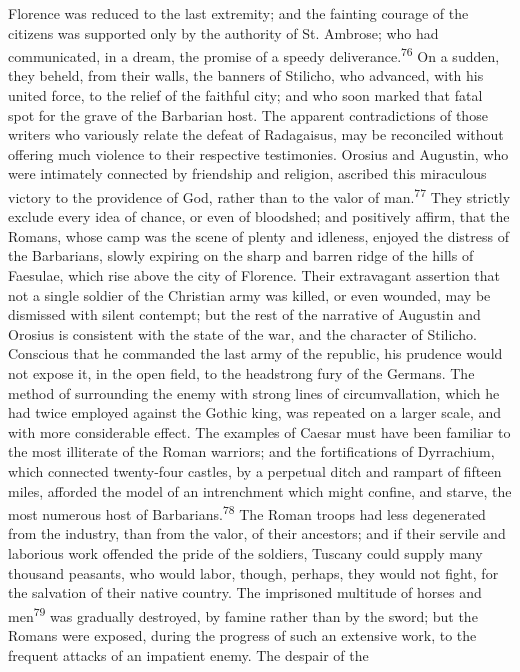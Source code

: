 Florence was reduced to the last extremity; and the fainting
courage of the citizens was supported only by the authority of
St. Ambrose; who had communicated, in a dream, the promise of a
speedy deliverance.\textsuperscript{76} On a sudden, they beheld, from their
walls, the banners of Stilicho, who advanced, with his united
force, to the relief of the faithful city; and who soon marked
that fatal spot for the grave of the Barbarian host. The apparent
contradictions of those writers who variously relate the defeat
of Radagaisus, may be reconciled without offering much violence
to their respective testimonies. Orosius and Augustin, who were
intimately connected by friendship and religion, ascribed this
miraculous victory to the providence of God, rather than to the
valor of man.\textsuperscript{77} They strictly exclude every idea of chance, or
even of bloodshed; and positively affirm, that the Romans, whose
camp was the scene of plenty and idleness, enjoyed the distress
of the Barbarians, slowly expiring on the sharp and barren ridge
of the hills of Faesulae, which rise above the city of Florence.
Their extravagant assertion that not a single soldier of the
Christian army was killed, or even wounded, may be dismissed with
silent contempt; but the rest of the narrative of Augustin and
Orosius is consistent with the state of the war, and the
character of Stilicho. Conscious that he commanded the last army
of the republic, his prudence would not expose it, in the open
field, to the headstrong fury of the Germans. The method of
surrounding the enemy with strong lines of circumvallation, which
he had twice employed against the Gothic king, was repeated on a
larger scale, and with more considerable effect. The examples of
Caesar must have been familiar to the most illiterate of the
Roman warriors; and the fortifications of Dyrrachium, which
connected twenty-four castles, by a perpetual ditch and rampart
of fifteen miles, afforded the model of an intrenchment which
might confine, and starve, the most numerous host of Barbarians.\textsuperscript{78}
The Roman troops had less degenerated from the industry, than
from the valor, of their ancestors; and if their servile and
laborious work offended the pride of the soldiers, Tuscany could
supply many thousand peasants, who would labor, though, perhaps,
they would not fight, for the salvation of their native country.
The imprisoned multitude of horses and men\textsuperscript{79} was gradually
destroyed, by famine rather than by the sword; but the Romans
were exposed, during the progress of such an extensive work, to
the frequent attacks of an impatient enemy. The despair of the
